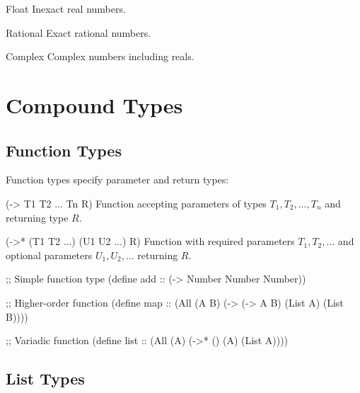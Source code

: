 \begin{typespec}{Float}
Inexact real numbers.
\end{typespec}

\begin{typespec}{Rational}
Exact rational numbers.
\end{typespec}

\begin{typespec}{Complex}
Complex numbers including reals.
\end{typespec}

\section{Compound Types}
\label{sec:compound-types}


\subsection{Function Types}
\label{subsec:function-types}

Function types specify parameter and return types:

\begin{typespec}{(-> T1 T2 ... Tn R)}
Function accepting parameters of types $T_1, T_2, \ldots, T_n$ and returning type $R$.
\end{typespec}

\begin{typespec}{(->* (T1 T2 ...) (U1 U2 ...) R)}
Function with required parameters $T_1, T_2, \ldots$ and optional parameters $U_1, U_2, \ldots$ returning $R$.
\end{typespec}

\begin{example}
\begin{lambdustcode}
;; Simple function type
(define add :: (-> Number Number Number))

;; Higher-order function  
(define map :: (All (A B) (-> (-> A B) (List A) (List B))))

;; Variadic function
(define list :: (All (A) (->* () (A) (List A))))
\end{lambdustcode}
\end{example}

\subsection{List Types}
\label{subsec:list-types}

